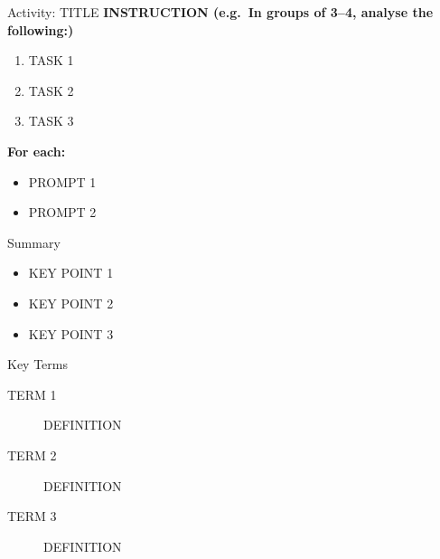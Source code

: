 \begin{frame}{Activity: TITLE}
    \textbf{INSTRUCTION (e.g.\ In groups of 3--4, analyse the following:)}
    \begin{enumerate}
        \item TASK 1
        \item TASK 2
        \item TASK 3
    \end{enumerate}

    \vspace{0.5em}
    \textbf{For each:}
    \begin{itemize}
        \item PROMPT 1
        \item PROMPT 2
    \end{itemize}
\end{frame}

\begin{frame}{Summary}
    \begin{itemize}\setlength\itemsep{0.35em}
        \item KEY POINT 1
        \item KEY POINT 2
        \item KEY POINT 3
    \end{itemize}
\end{frame}

\begin{frame}{Key Terms}
    \begin{description}
        \item[TERM 1] DEFINITION
        \item[TERM 2] DEFINITION
        \item[TERM 3] DEFINITION
    \end{description}
\end{frame}



